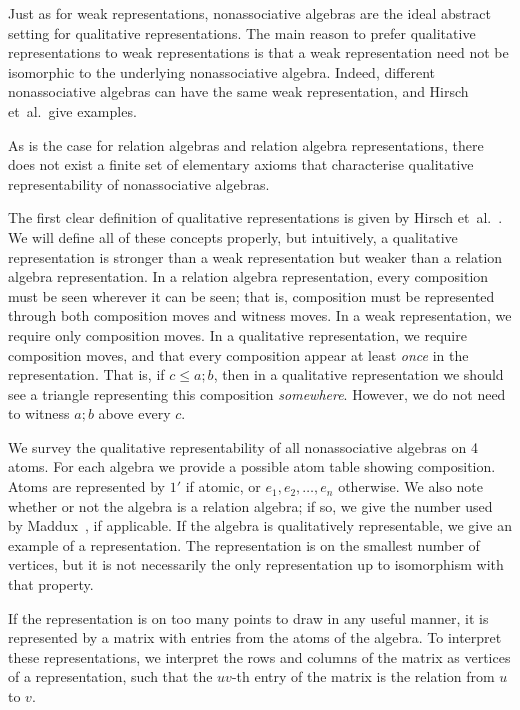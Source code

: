 \documentclass[12pt]{article}
\theoremstyle{definition}
\newcommand{\comp}{\mathbin{;}}%
\newcommand{\id}{{1'}}%
\begin{document}
  Just as for weak representations, nonassociative algebras are the ideal abstract setting for qualitative representations. The main reason to prefer qualitative representations to weak representations is that a weak representation need not be isomorphic to the underlying nonassociative algebra. Indeed, different nonassociative algebras can have the same weak representation, and Hirsch et~al.~give examples. 

As is the case for relation algebras and relation algebra representations, there does not exist a finite set of elementary axioms that characterise qualitative representability of nonassociative algebras.



  The first clear definition of qualitative representations is given by Hirsch et~al.~\cite{HirschJacksonKowalski2016}. We will define all of these concepts properly, but intuitively, a qualitative representation is stronger than a weak representation but weaker than a relation algebra representation. In a relation algebra representation, every composition must be seen wherever it can be seen; that is, composition must be represented through both composition moves and witness moves. In a weak representation, we require only composition moves. In a qualitative representation, we require composition moves, and that every composition appear at least \emph{once} in the representation. That is, if $c \le a \comp b$, then in a qualitative representation we should see a triangle representing this composition \emph{somewhere}. However, we do not need to witness $a \comp b$ above every $c$.

We survey the qualitative representability of all nonassociative algebras on 4 atoms. For each algebra we provide a possible atom table showing composition. Atoms are represented by $\id$ if atomic, or $e_1, e_2, \dots, e_n$ otherwise. We also note whether or not the algebra is a relation algebra; if so, we give the number used by Maddux~\cite{Maddux2006}, if applicable. If the algebra is qualitatively representable, we give an example of a representation. The representation is on the smallest number of vertices, but it is not necessarily the only representation up to isomorphism with that property.

  If the representation is on too many points to draw in any useful manner, it is represented by a matrix with entries from the atoms of the algebra. To interpret these representations, we interpret the rows and columns of the matrix as vertices of a representation, such that the $uv$-th entry of the matrix is the relation from $u$ to $v$.
\end{document}

